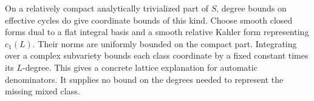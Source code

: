 On a relatively compact analytically trivialized part of \(S\),
degree bounds on effective cycles do give coordinate bounds of this
kind. Choose smooth closed forms dual to a flat integral basis and
a smooth relative Kahler form representing \(c_1(L)\). Their norms
are uniformly bounded on the compact part. Integrating over a
complex subvariety bounds each class coordinate by a fixed constant
times its \(L\)-degree. This gives a concrete lattice explanation
for automatic denominators. It supplies no bound on the degrees
needed to represent the missing mixed class.
